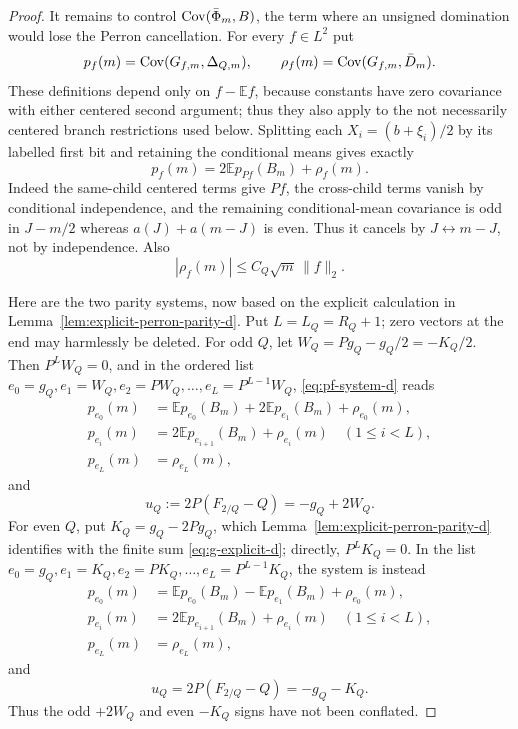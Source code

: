 \documentclass[11pt]{article}
\numberwithin{equation}{section}
\newcommand{\E}{\mathbb E}\newcommand{\Pp}{\mathbb P}
\newcommand{\1}{\mathbf 1}\newcommand{\F}{\mathcal F}\newcommand{\D}{\mathcal D}
\begin{document}
\begin{proof}
It remains to control $\operatorname{Cov}(\bar\Phi_m,B)$, the term where an unsigned
domination would lose the Perron cancellation.  For every $f\in L^2$ put
\[
 p_f(m)=\operatorname{Cov}(G_{f,m},\Delta_{Q,m}),\qquad
 \rho_f(m)=\operatorname{Cov}(G_{f,m},\bar D_m).
\]
These definitions depend only on $f-\E f$, because constants have zero
covariance with either centered second argument; thus they also apply to the
not necessarily centered branch restrictions used below.
Splitting each $X_i=(b+\xi_i)/2$ by its labelled first bit and retaining the
conditional means gives exactly
\begin{equation}p_f(m)=2\E p_{Pf}(B_m)+\rho_f(m).       \label{eq:pf-system-d}\end{equation}
Indeed the same-child centered terms give $P f$, the cross-child terms vanish
by conditional independence, and the remaining conditional-mean covariance
is odd in $J-m/2$ whereas $a(J)+a(m-J)$ is even.  Thus it cancels by
$J\leftrightarrow m-J$, not by independence.  Also
\begin{equation}|\rho_f(m)|\le C_Q\sqrt m\,\|f\|_2.    \label{eq:rho-f-d}\end{equation}

Here are the two parity systems, now based on the explicit calculation in
Lemma~\ref{lem:explicit-perron-parity-d}.  Put $L=L_Q=R_Q+1$; zero vectors
at the end may harmlessly be deleted.  For odd $Q$, let
$W_Q=Pg_Q-g_Q/2=-K_Q/2$.  Then $P^LW_Q=0$, and in the ordered list
$e_0=g_Q,e_1=W_Q,e_2=PW_Q,\ldots,e_L=P^{L-1}W_Q$,
\eqref{eq:pf-system-d} reads
\begin{align*}
 p_{e_0}(m)&=\E p_{e_0}(B_m)+2\E p_{e_1}(B_m)+\rho_{e_0}(m),\\
 p_{e_i}(m)&=2\E p_{e_{i+1}}(B_m)+\rho_{e_i}(m)\quad(1\le i<L),\\
 p_{e_L}(m)&=\rho_{e_L}(m),
\end{align*}
and
\begin{equation}u_Q:=2P(F_{2/Q}-Q)=-g_Q+2W_Q.          \label{eq:odd-sign-d}\end{equation}
For even $Q$, put $K_Q=g_Q-2Pg_Q$, which
Lemma~\ref{lem:explicit-perron-parity-d} identifies with the finite sum
\eqref{eq:g-explicit-d}; directly, $P^LK_Q=0$.  In the list
$e_0=g_Q,e_1=K_Q,e_2=PK_Q,\ldots,e_L=P^{L-1}K_Q$, the system is instead
\begin{align*}
 p_{e_0}(m)&=\E p_{e_0}(B_m)-\E p_{e_1}(B_m)+\rho_{e_0}(m),\\
 p_{e_i}(m)&=2\E p_{e_{i+1}}(B_m)+\rho_{e_i}(m)\quad(1\le i<L),\\
 p_{e_L}(m)&=\rho_{e_L}(m),
\end{align*}
and
\begin{equation}u_Q=2P(F_{2/Q}-Q)=-g_Q-K_Q.             \label{eq:even-sign-d}\end{equation}
Thus the odd $+2W_Q$ and even $-K_Q$ signs have not been conflated.


\end{proof}
\end{document}
